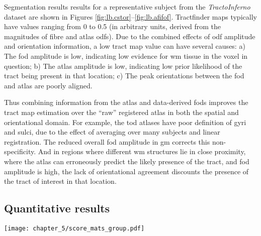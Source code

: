 \documentclass[12pt,phd,a4paper,twoside]{ucl_thesis}
\providecommand{\DIFaddtex}[1]{{\protect\color{blue} \sf #1}} %
\providecommand{\DIFdeltex}[1]{{\protect\color{red} \scriptsize #1}} %
\providecommand{\DIFaddbegin}{} %
\providecommand{\DIFaddend}{} %
\providecommand{\DIFdelbegin}{} %
\providecommand{\DIFdelend}{} %
\providecommand{\DIFadd}[1]{\texorpdfstring{\DIFaddtex{#1}}{#1}} %
\providecommand{\DIFdel}[1]{\texorpdfstring{\DIFdeltex{#1}}{}} %
\newcommand{\DIFscaledelfig}{0.5}
\newlength{\DIFdelgraphicswidth} %
\newlength{\DIFdelgraphicsheight} %
\newcommand{\DIFaddincludegraphics}[2][]{{\color{blue}\fbox{\DIFOincludegraphics[#1]{#2}}}} %
\newcommand{\DIFdelincludegraphics}[2][]{%
\sbox{\DIFdelgraphicsbox}{\DIFOincludegraphics[#1]{#2}}%
\settoboxwidth{\DIFdelgraphicswidth}{\DIFdelgraphicsbox} %
\settoboxtotalheight{\DIFdelgraphicsheight}{\DIFdelgraphicsbox} %
\scalebox{\DIFscaledelfig}{%
\parbox[b]{\DIFdelgraphicswidth}{\usebox{\DIFdelgraphicsbox}\\[-\baselineskip] \rule{\DIFdelgraphicswidth}{0em}}\llap{\resizebox{\DIFdelgraphicswidth}{\DIFdelgraphicsheight}{%
\setlength{\unitlength}{\DIFdelgraphicswidth}%
\begin{picture}(1,1)%
\thicklines\linethickness{2pt} %
{\color[rgb]{1,0,0}\put(0,0){\framebox(1,1){}}}%
{\color[rgb]{1,0,0}\put(0,0){\line( 1,1){1}}}%
{\color[rgb]{1,0,0}\put(0,1){\line(1,-1){1}}}%
\end{picture}%
}\hspace*{3pt}}} %
} %
\DeclareRobustCommand{\DIFaddbegin}{\DIFOaddbegin \let\includegraphics\DIFaddincludegraphics} %
\DeclareRobustCommand{\DIFaddend}{\DIFOaddend \let\includegraphics\DIFOincludegraphics} %
\DeclareRobustCommand{\DIFdelbegin}{\DIFOdelbegin \let\includegraphics\DIFdelincludegraphics} %
\DeclareRobustCommand{\DIFdelend}{\DIFOaddend \let\includegraphics\DIFOincludegraphics} %
\begin{document}
Segmentation results results for a representative subject from the \textit{TractoInferno} dataset are shown in Figures \ref{fig:lb.cstor}--\ref{fig:lb.afifof}.
Tractfinder maps typically have values ranging from 0 to 0.5 (in arbitrary units, derived from the magnitudes of fibre and atlas \glspl{odf}).
Due to the combined effects of \gls{odf} amplitude and orientation information, a low tract map value can have several causes:
a) The \gls{fod} amplitude is low, indicating low evidence for \gls{wm} tissue in the voxel in question;
b) The atlas amplitude is low, indicating low prior likelihood of the tract being present in that location;
c) The peak orientations between the \gls{fod} and atlas are poorly aligned.

Thus combining information from the atlas and data-derived \glspl{fod} improves the tract map estimation over the ``raw'' registered atlas in both the spatial and orientational domain. For example, the \gls{tod} atlases have poor definition of gyri and sulci, due to the effect of averaging over many subjects and linear registration. The reduced overall \gls{fod} amplitude in \gls{gm} corrects this non-specificity. And in regions where different \gls{wm} structures lie in close proximity, where the atlas can erroneously predict the likely presence of the tract, and \gls{fod} amplitude is high, the lack of orientational agreement discounts the presence of the tract of interest in that location.

\subsection{Quantitative results}\label{sec:quant}

\begin{SCfigure}
  \texttt{[image: chapter\_5/score\_mats\_group.pdf]}
  \caption[Pairwise DSC and density correlations for the \textit{TractoInferno}, HCP, and clinical datasets]{Pairwise  and density correlations for the \textit{TractoInferno} (top) HCP49 (middle) and clinical (bottom) datasets.
  \DIFaddbegin \DIFadd{Upper triangles show density correlation means (background colour) and distributions (white boxplots), lower triangles show the binary }\glspl{dice} \DIFadd{for each pairwise method comparison.
  }\DIFaddend For each \DIFdelbegin \DIFdel{pair of methods}\DIFdelend \DIFaddbegin \DIFadd{combination}\DIFaddend , the metric distributions across all subjects are shown for \DIFdelbegin \DIFdel{each tract }\DIFdelend \DIFaddbegin \DIFadd{the four tracts separately }\DIFaddend (from left to right: , , , )\DIFdelbegin \DIFdel{, with background colours corresponding to mean score value}\DIFdelend . 
  \label{fig:dscmats}}
\end{SCfigure}
\end{document}
